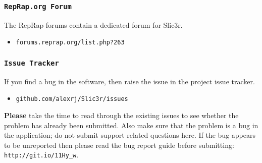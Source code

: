 
\subsubsection{\texttt{RepRap.org Forum}} %
\label{sub:reprap_org_forum}


The RepRap forums contain a dedicated forum for Slic3r.
\begin{itemize}
    \item \texttt{forums.reprap.org/list.php?263}
\end{itemize}


\subsubsection{\texttt{Issue Tracker}} %
\label{sub:issue_tracker}

If you find a bug in the software, then raise the issue in the project issue tracker.

\begin{itemize}
    \item \texttt{github.com/alexrj/Slic3r/issues}
\end{itemize}

\textbf{Please} take the time to read through the existing issues to see whether the problem has already been submitted.  Also make sure that the problem is a bug in the application; do not submit support related questions here.
If the bug appears to be unreported then please read the bug report guide before submitting: \texttt{http://git.io/11Hy\_w}.

